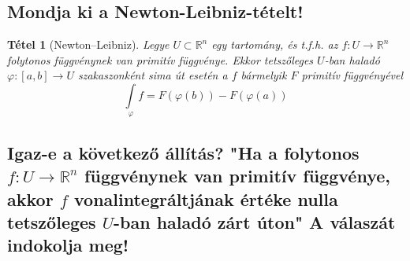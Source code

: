 \documentclass[12pt,a4paper]{article}
\newcommand{\R}{\mathbb{R}}
\newcommand{\f}{\varphi}
\newtheorem{tet}{Tétel}[section]
\begin{document}
\subsection{Mondja ki a Newton-Leibniz-tételt!}
\begin{tet}[Newton–Leibniz]
Legye $U \subset \R^n$ egy tartomány, és t.f.h. az $f : U \to \R^n$
folytonos függvénynek van primitív függvénye. Ekkor tetszőleges $U$-ban haladó $\f : [a, b] \to U$ szakaszonként sima út esetén a $f$ bármelyik $F$ primitív függvényével
\[
\int\limits_\f f = F(\f(b))-F(\f(a))
\]
\end{tet}
\subsection{Igaz-e a következő állítás? "Ha a folytonos $f : U \to \R^n$ függvénynek van primitív függvénye, akkor $f$ vonalintegráltjának értéke nulla tetszőleges $U$-ban haladó zárt úton" A válaszát indokolja meg!}
\end{document}
